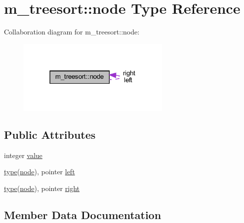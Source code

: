 \hypertarget{structm__treesort_1_1node}{}\section{m\+\_\+treesort\+:\+:node Type Reference}
\label{structm__treesort_1_1node}


Collaboration diagram for m\+\_\+treesort\+:\+:node\+:
\nopagebreak
\begin{figure}[H]
\begin{center}
\leavevmode
\includegraphics[width=210pt]{structm__treesort_1_1node__coll__graph}
\end{center}
\end{figure}
\subsection*{Public Attributes}
\begin{DoxyCompactItemize}
\item 
integer \hyperlink{structm__treesort_1_1node_a8d43ab5fa2b62b0255b0510173508026}{value}
\item 
\hyperlink{stop__watch_83_8txt_a70f0ead91c32e25323c03265aa302c1c}{type}(\hyperlink{structm__treesort_1_1node}{node}), pointer \hyperlink{structm__treesort_1_1node_a2fb0da65659716ef6eff88ab8753f247}{left}
\item 
\hyperlink{stop__watch_83_8txt_a70f0ead91c32e25323c03265aa302c1c}{type}(\hyperlink{structm__treesort_1_1node}{node}), pointer \hyperlink{structm__treesort_1_1node_adfd2c4a14b54fe93048b2d54ed9ed7b6}{right}
\end{DoxyCompactItemize}


\subsection{Member Data Documentation}
\mbox{\label{structm__treesort_1_1node_a2fb0da65659716ef6eff88ab8753f247}} 
